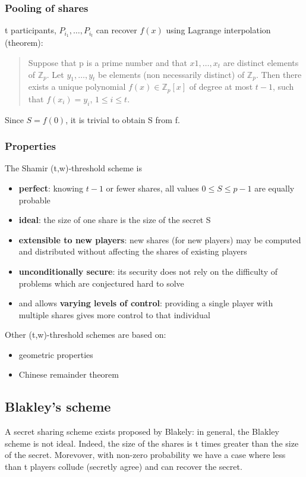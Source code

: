 \documentclass[a4paper, 10pt, titlepage]{article}
\begin{document}
\subsubsection*{Pooling of shares}
t participants, $P_{i_1}, \dots, P_{i_t}$ can recover $f(x)$ using Lagrange interpolation (theorem):
\begin{quote}
Suppose that p is a prime number and that $x1, \dots, x_t$ are distinct elements of $\mathbb{Z}_p$. Let $y_1, \dots, y_t$ be elements (non necessarily distinct) of $\mathbb{Z}_p$. Then there exists a unique polynomial $f (x) \in \mathbb{Z}_p[x]$ of degree at most $t - 1$, such that $f (x_i) = y_i$, $1 \leq i \leq t$.
\end{quote}
Since $S = f (0)$, it is trivial to obtain S from f. 

\subsubsection{Properties}
The Shamir (t,w)-threshold scheme is
\begin{itemize}
\item \textbf{perfect}: knowing $t - 1$ or fewer shares, all values $0 \leq S \leq p - 1$ are equally probable
\item \textbf{ideal}: the size of one share is the size of the secret S
\item \textbf{extensible to new players}: new shares (for new players) may be computed and distributed without affecting the shares of existing players
\item \textbf{unconditionally secure}: its security does not rely on the difficulty of problems which are conjectured hard to solve
\item and allows \textbf{varying levels of control}: providing a single player with multiple shares gives more control to that individual
\end{itemize}
Other (t,w)-threshold schemes are based on:
\begin{itemize}
\item geometric properties
\item Chinese remainder theorem
\end{itemize}

\subsection{Blakley's scheme}
A secret sharing scheme exists proposed by Blakely: in general, the Blakley scheme is not ideal. Indeed, the size of the shares is t times greater than the size of the secret. Morevover, with non-zero probability we have a case where less than t players collude (secretly agree) and can recover the secret.
\end{document}
